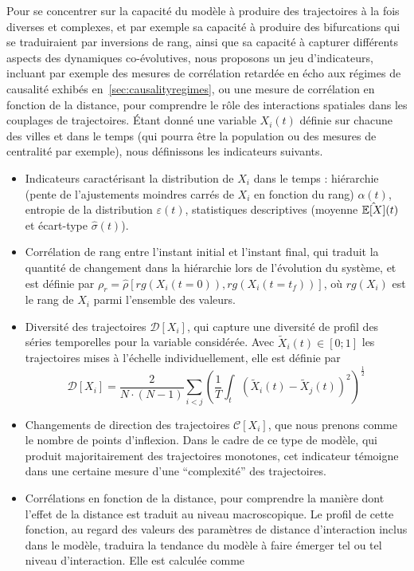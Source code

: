 Pour se concentrer sur la capacité du modèle à produire des trajectoires à la fois diverses et complexes, et par exemple sa capacité à produire des bifurcations qui se traduiraient par inversions de rang, ainsi que sa capacité à capturer différents aspects des dynamiques co-évolutives, nous proposons un jeu d'indicateurs, incluant par exemple des mesures de corrélation retardée en écho aux régimes de causalité exhibés en~\ref{sec:causalityregimes}, ou une mesure de corrélation en fonction de la distance, pour comprendre le rôle des interactions spatiales dans les couplages de trajectoires. Étant donné une variable $X_i(t)$ définie sur chacune des villes et dans le temps (qui pourra être la population ou des mesures de centralité par exemple), nous définissons les indicateurs suivants.

\begin{itemize}
  \item Indicateurs caractérisant la distribution de $X_i$ dans le temps : hiérarchie (pente de l'ajustements moindres carrés de $X_i$ en fonction du rang) $\alpha (t)$, entropie de la distribution $\varepsilon (t)$, statistiques descriptives (moyenne $\hat{\operatorname{\mathbb{E}}\!\left[X\right]} (t)$ et écart-type $\hat{\sigma} (t)$).
  \item Corrélation de rang entre l'instant initial et l'instant final, qui traduit la quantité de changement dans la hiérarchie lors de l'évolution du système, et est définie par $\rho_r = \hat{\rho}\left[rg(X_i(t=0)),rg(X_i(t=t_f))\right]$, où $rg(X_i)$ est le rang de $X_i$ parmi l'ensemble des valeurs.
  \item Diversité des trajectoires $\mathcal{D}\left[X_i\right]$, qui capture une diversité de profil des séries temporelles pour la variable considérée. Avec $\tilde{X}_i(t)\in \left[0;1\right]$ les trajectoires mises à l'échelle individuellement, elle est définie par
\[
\mathcal{D}\left[X_i\right] = \frac{2}{N\cdot(N-1)}\sum_{i<j} \left(\frac{1}{T}\int_{t} \left(\tilde{X}_i(t) - \tilde{X}_j(t)\right)^2 \right)^{\frac{1}{2}}
\]
\item Changements de direction des trajectoires $\mathcal{C}\left[X_i\right]$, que nous prenons comme le nombre de points d'inflexion. Dans le cadre de ce type de modèle, qui produit majoritairement des trajectoires monotones, cet indicateur témoigne dans une certaine mesure d'une ``complexité'' des trajectoires.
\item Corrélations en fonction de la distance, pour comprendre la manière dont l'effet de la distance est traduit au niveau macroscopique. Le profil de cette fonction, au regard des valeurs des paramètres de distance d'interaction inclus dans le modèle, traduira la tendance du modèle à faire émerger tel ou tel niveau d'interaction. Elle est calculée comme

\end{itemize}
